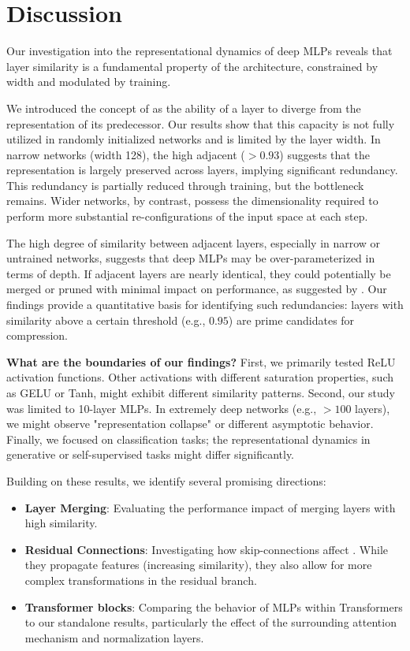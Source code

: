 \section{Discussion}
\label{sec:discussion}

Our investigation into the representational dynamics of deep MLPs reveals that layer similarity is a fundamental property of the architecture, constrained by width and modulated by training.

We introduced the concept of \transcap as the ability of a layer to diverge from the representation of its predecessor. Our results show that this capacity is not fully utilized in randomly initialized networks and is limited by the layer width. In narrow networks (width 128), the high adjacent \cka ($>0.93$) suggests that the representation is largely preserved across layers, implying significant redundancy. This redundancy is partially reduced through training, but the bottleneck remains. Wider networks, by contrast, possess the dimensionality required to perform more substantial re-configurations of the input space at each step.

The high degree of similarity between adjacent layers, especially in narrow or untrained networks, suggests that deep MLPs may be over-parameterized in terms of depth. If adjacent layers are nearly identical, they could potentially be merged or pruned with minimal impact on performance, as suggested by \citet{yang2024laco}. Our findings provide a quantitative basis for identifying such redundancies: layers with \cka similarity above a certain threshold (e.g., $0.95$) are prime candidates for compression.

{\bf What are the boundaries of our findings?} First, we primarily tested ReLU activation functions. Other activations with different saturation properties, such as GELU or Tanh, might exhibit different similarity patterns. Second, our study was limited to 10-layer MLPs. In extremely deep networks (e.g., $>100$ layers), we might observe "representation collapse" or different asymptotic behavior. Finally, we focused on classification tasks; the representational dynamics in generative or self-supervised tasks might differ significantly.

Building on these results, we identify several promising directions:
\begin{itemize}[leftmargin=*,itemsep=0pt,topsep=0pt]
    \item {\bf Layer Merging}: Evaluating the performance impact of merging layers with high \cka similarity.
    \item {\bf Residual Connections}: Investigating how skip-connections affect \transcap. While they propagate features (increasing similarity), they also allow for more complex transformations in the residual branch.
    \item {\bf Transformer blocks}: Comparing the behavior of MLPs within Transformers to our standalone results, particularly the effect of the surrounding attention mechanism and normalization layers.
\end{itemize}
